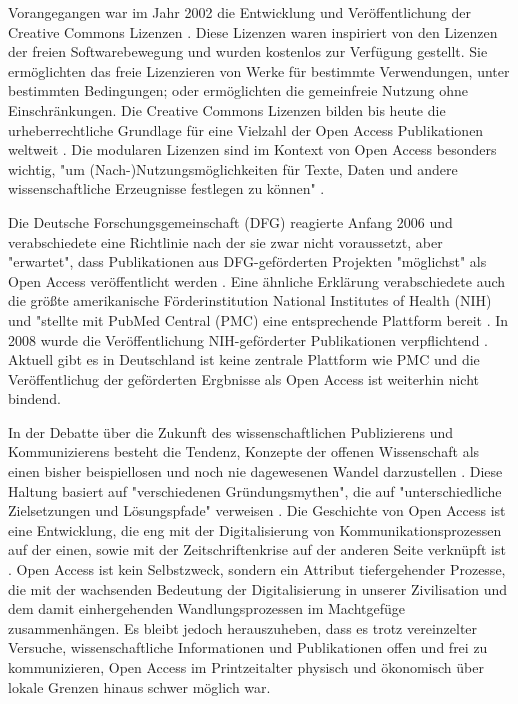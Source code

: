 Vorangegangen war im Jahr 2002 die Entwicklung und Veröffentlichung der Creative Commons Lizenzen \cite{suchen-Hoffmann-Zugang-undVerwertung-oeffentlicher-Informationen}. Diese Lizenzen waren inspiriert von den Lizenzen der freien Softwarebewegung und wurden kostenlos zur Verfügung gestellt. Sie ermöglichten das freie Lizenzieren von Werke für bestimmte Verwendungen, unter bestimmten Bedingungen; oder ermöglichten die gemeinfreie Nutzung ohne Einschränkungen. Die Creative Commons Lizenzen bilden bis heute die urheberrechtliche Grundlage für eine Vielzahl der Open Access Publikationen weltweit \cite{suchen}. Die modularen Lizenzen sind im Kontext von Open Access besonders wichtig, "um (Nach-)Nutzungsmöglichkeiten für Texte, Daten und andere wissenschaftliche Erzeugnisse festlegen zu können" \cite{suchen-Hoffmann-Zugang-undVerwertung-oeffentlicher-Informationen}.

Die Deutsche Forschungsgemeinschaft (DFG) reagierte Anfang 2006 und verabschiedete eine Richtlinie nach der sie zwar nicht voraussetzt, aber "erwartet", dass Publikationen aus DFG-geförderten Projekten "möglichst" als Open Access veröffentlicht werden \cite{suchen:dfg-richtlinie}. Eine ähnliche Erklärung verabschiedete auch die größte amerikanische Förderinstitution National Institutes of Health (NIH) und "stellte mit PubMed Central (PMC) eine entsprechende Plattform bereit \cite{muller_2010_open}. In 2008 wurde die Veröffentlichung NIH-geförderter Publikationen verpflichtend \cite{Hanekop_2014}. Aktuell gibt es in Deutschland ist keine zentrale Plattform wie PMC und die Veröffentlichug der geförderten Ergbnisse als Open Access ist weiterhin nicht bindend.

In der Debatte über die Zukunft des wissenschaftlichen Publizierens und Kommunizierens besteht die Tendenz, Konzepte der offenen Wissenschaft als einen bisher beispiellosen und noch nie dagewesenen Wandel darzustellen \cite{cite:17a} \cite{cite:17b}. Diese Haltung basiert auf "verschiedenen Gründungsmythen", die auf "unterschiedliche Zielsetzungen und Lösungspfade" verweisen \cite{suchen-Hoffmann-Zugang-undVerwertung-oeffentlicher-Informationen}. Die Geschichte von Open Access ist eine Entwicklung, die eng mit der Digitalisierung von Kommunikationsprozessen \cite{albert_2006_open_implications} auf der einen, sowie mit der Zeitschriftenkrise auf der anderen Seite verknüpft ist \cite{suchen-Hoffmann-Zugang-undVerwertung-oeffentlicher-Informationen}. Open Access ist kein Selbstzweck\cite{cite:17d}, sondern ein Attribut tiefergehender Prozesse, die mit der wachsenden Bedeutung der Digitalisierung in unserer Zivilisation und dem damit einhergehenden Wandlungsprozessen im Machtgefüge zusammenhängen\cite{cite:17e}. Es bleibt jedoch herauszuheben, dass es trotz vereinzelter Versuche, wissenschaftliche Informationen und Publikationen offen und frei zu kommunizieren, Open Access im Printzeitalter physisch und ökonomisch über lokale Grenzen hinaus schwer möglich war\cite{cite:18a}.

